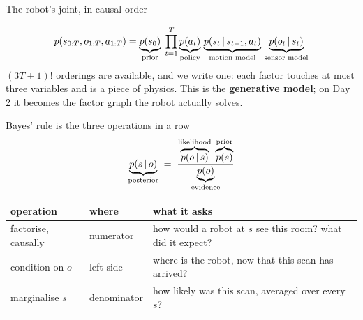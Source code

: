 \documentclass[10pt, aspectratio=169]{beamer}
\begin{document}
\begin{frame}{The robot's joint, in causal order}
  \centering
  \[
    p(s_{0:T}, o_{1:T}, a_{1:T}) =
    \underbrace{p(s_0)}_{\text{prior}}\;
    \prod_{t=1}^{T}
    \underbrace{p(a_t)}_{\text{policy}}\,
    \underbrace{p(s_t\,|\, s_{t-1}, a_t)}_{\text{motion model}}\,
    \underbrace{p(o_t\,|\, s_t)}_{\text{sensor model}}
  \]
  \small
  $(3T+1)!$ orderings are available, and we write one: each factor touches at most three
  variables and is a piece of physics. This is the \textbf{generative model}; on Day 2 it becomes
  the factor graph the robot actually solves.
\end{frame}

\begin{frame}{Bayes' rule is the three operations in a row}
  \[
    \underbrace{p(s\,|\, o)}_{\text{posterior}}
    \;=\;
    \frac{\overbrace{p(o\,|\, s)}^{\text{likelihood}}\;\overbrace{p(s)}^{\text{prior}}}
         {\underbrace{p(o)}_{\text{evidence}}}
  \]
  \begin{tabular}{@{}l l l@{}}
    \toprule
    operation & where & what it asks \\
    \midrule
    factorise, causally & numerator   & how would a robot at $s$ see this room? what did it expect? \\
    condition on $o$    & left side   & where is the robot, now that this scan has arrived? \\
    marginalise $s$     & denominator & how likely was this scan, averaged over every $s$? \\
    \bottomrule
  \end{tabular}

  \vspace{0.8em}
\end{frame}
\end{document}

